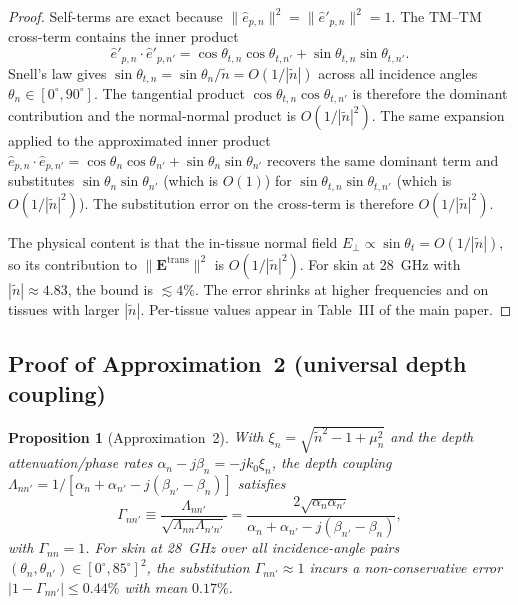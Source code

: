 \documentclass[10pt,journal,twocolumn]{IEEEtran}
\newcommand{\ntilde}{\tilde{n}}
\theoremstyle{plain}
\newtheorem{proposition}{Proposition}[section]
\theoremstyle{definition}
\begin{document}
\begin{proof}
Self-terms are exact because $\|\hat{e}_{p,n}\|^2 =
\|\hat{e}'_{p,n}\|^2 = 1$. The TM--TM cross-term contains the inner
product
\begin{equation}\label{eq:eppdot}
  \hat{e}'_{p,n} \cdot \hat{e}'_{p,n'}
  = \cos\theta_{t,n}\cos\theta_{t,n'}
  + \sin\theta_{t,n}\sin\theta_{t,n'}.
\end{equation}
Snell's law gives $\sin\theta_{t,n} = \sin\theta_n / \ntilde =
O(1/|\ntilde|)$ across all incidence angles
$\theta_n \in [0^{\circ}, 90^{\circ}]$. The tangential product
$\cos\theta_{t,n}\cos\theta_{t,n'}$ is therefore the dominant
contribution and the normal-normal product is $O(1/|\ntilde|^2)$.
The same expansion applied to the approximated inner product
$\hat{e}_{p,n} \cdot \hat{e}_{p,n'} = \cos\theta_n\cos\theta_{n'}
+ \sin\theta_n\sin\theta_{n'}$ recovers the same dominant term and
substitutes $\sin\theta_n\sin\theta_{n'}$ (which is $O(1)$) for
$\sin\theta_{t,n}\sin\theta_{t,n'}$ (which is $O(1/|\ntilde|^2)$).
The substitution error on the cross-term is therefore
$O(1/|\ntilde|^2)$.

The physical content is that the in-tissue normal field
$E_\perp \propto \sin\theta_t = O(1/|\ntilde|)$, so its contribution
to $\|\bm{E}^{\mathrm{trans}}\|^2$ is $O(1/|\ntilde|^2)$. For skin
at 28~GHz with $|\ntilde| \approx 4.83$, the bound is
$\lesssim 4\%$. The error shrinks at higher frequencies and on
tissues with larger $|\ntilde|$. Per-tissue values appear in
Table~III of the main paper.
\end{proof}

\subsection{Proof of Approximation~2 (universal depth coupling)}

\begin{proposition}[Approximation~2]\label{prop:S-approx2}
With $\xi_n = \sqrt{\ntilde^2 - 1 + \mu_n^2}$ and the depth
attenuation/phase rates $\alpha_n - j\beta_n = -j k_0 \xi_n$, the
depth coupling
$\Lambda_{nn'} = 1 / [\alpha_n + \alpha_{n'} - j(\beta_{n'} - \beta_n)]$
satisfies
\begin{equation}\label{eq:Gamma-norm}
  \Gamma_{nn'}
    \equiv \frac{\Lambda_{nn'}}{\sqrt{\Lambda_{nn}\Lambda_{n'n'}}}
    = \frac{2\sqrt{\alpha_n \alpha_{n'}}}
           {\alpha_n + \alpha_{n'} - j(\beta_{n'} - \beta_n)},
\end{equation}
with $\Gamma_{nn}=1$. For skin at 28~GHz over all
incidence-angle pairs $(\theta_n, \theta_{n'}) \in
[0^{\circ}, 85^{\circ}]^2$, the substitution $\Gamma_{nn'} \approx 1$
incurs a non-conservative error $|1 - \Gamma_{nn'}| \leq 0.44\%$
with mean $0.17\%$.
\end{proposition}
\end{document}
